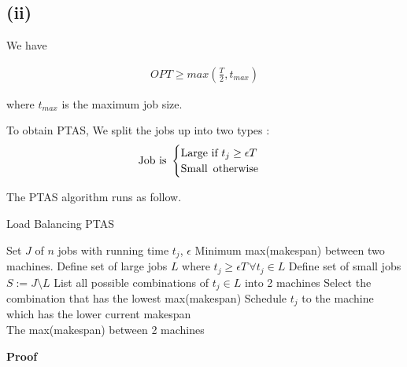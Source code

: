 \subsection*{(ii)}
\label{approx-3-1-ii}


We have 

\begin{align*}
	OPT \geq max(\frac{T}{2}, t_{max})
\end{align*}

where $t_{max}$ is the maximum job size.


To obtain PTAS, We split the jobs up into two types :
\begin{align*}
    \text{Job is } \begin{cases}
        \text{Large} \text{ if } t_j \ge \epsilon T \\
        \text{Small} \text{\, otherwise}
    \end{cases}
\end{align*}


The PTAS algorithm runs as follow.

\begin{algorithm}[H]
  \caption{Load Balancing PTAS}
  \label{alg:load_balancing_ptas}
  \begin{algorithmic}
    \Require Set $J$ of $n$ jobs with running time $t_j$, $\epsilon$
    \Ensure Minimum max(makespan) between two machines.
    \renewcommand{\algorithmicrequire}{\textbf{Input:}}
    \renewcommand{\algorithmicensure}{\textbf{Output:}}
    \algnewcommand{}
    \algnewcommand\Operation{\item[\algorithmicoperation]}
    \Operation
    \State Define set of large jobs $L$ where $t_j \geq \epsilon T \, \forall t_j \in L$
    \State Define set of small jobs $S := J \setminus L$
    \State List all possible combinations of $t_j \in L$ into 2 machines
    \State Select the combination that has the lowest max(makespan)
    \State Schedule $ t_j $ to the machine which has the lower current makespan
    \EndFor\\
    \Return The max(makespan) between 2 machines
  \end{algorithmic}
\end{algorithm}

\textbf{Proof}

